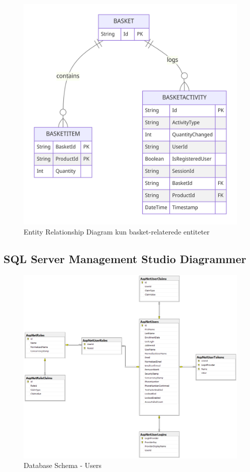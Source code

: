 \begin{figure}
    \centering
    \includegraphics[width=1\textwidth]{figures/diagrams/erd-basket-basketitem-basketact.png}
    \caption{Entity Relationship Diagram kun basket-relaterede entiteter}
    \label{fig:entity-relationship-diagram-basket}
\end{figure}

\subsection{SQL Server Management Studio Diagrammer}
\label{appendix:ssms-diagrams}
\begin{figure}
    \centering
    \includegraphics[width=1\textwidth]{figures/ssms/erd-identityusers.png}
    \caption{Database Schema - Users}
    \label{fig:database-schema-users}
\end{figure}

